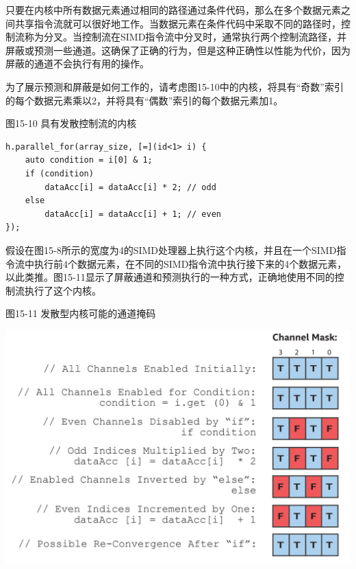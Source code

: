 只要在内核中所有数据元素通过相同的路径通过条件代码，那么在多个数据元素之间共享指令流就可以很好地工作。当数据元素在条件代码中采取不同的路径时，控制流称为分叉。当控制流在SIMD指令流中分叉时，通常执行两个控制流路径，并屏蔽或预测一些通道。这确保了正确的行为，但是这种正确性以性能为代价，因为屏蔽的通道不会执行有用的操作。\par

为了展示预测和屏蔽是如何工作的，请考虑图15-10中的内核，将具有“奇数”索引的每个数据元素乘以2，并将具有“偶数”索引的每个数据元素加1。\par

\hspace*{\fill} \par %
图15-10 具有发散控制流的内核
\begin{lstlisting}[caption={}]
h.parallel_for(array_size, [=](id<1> i) {
	auto condition = i[0] & 1;
	if (condition)
		dataAcc[i] = dataAcc[i] * 2; // odd
	else
		dataAcc[i] = dataAcc[i] + 1; // even
});
\end{lstlisting}

假设在图15-8所示的宽度为4的SIMD处理器上执行这个内核，并且在一个SIMD指令流中执行前4个数据元素，在不同的SIMD指令流中执行接下来的4个数据元素，以此类推。图15-11显示了屏蔽通道和预测执行的一种方式，正确地使用不同的控制流执行了这个内核。\par

\hspace*{\fill} \par %
图15-11 发散型内核可能的通道掩码
\begin{center}
	\includegraphics[width=1.0\textwidth]{content/chapter-15/images/8}
\end{center}

